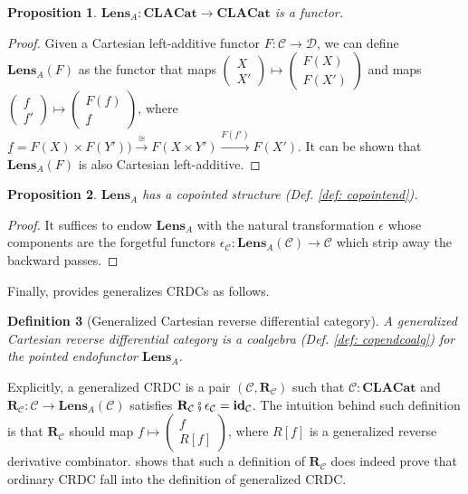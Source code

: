 \documentclass[12pt,a4paper,openright,twoside]{report}
\theoremstyle{plain}
\newtheorem{proposition}{Proposition}
\newtheorem{definition}[proposition]{Definition}
\theoremstyle{definition}
\begin{document}
\begin{proposition}
  $\mathbf{Lens}_A: \mathbf{CLACat} \to \mathbf{CLACat}$ is a functor.
\end{proposition}
\begin{proof}
  Given a Cartesian left-additive functor $F: \mathcal{C} \to \mathcal{D}$, we can define $\mathbf{Lens}_A(F)$ as the functor that maps $\left(\begin{smallmatrix}X  \\ X' \end{smallmatrix}\right) \mapsto \left(\begin{smallmatrix} F(X) \\ F(X') \end{smallmatrix}\right)$ and maps $\left(\begin{smallmatrix}f  \\ f' \end{smallmatrix}\right) \mapsto \left(\begin{smallmatrix} F(f) \\ \underline{f} \end{smallmatrix}\right)$, where $\underline{f} = F(X) \times F(Y')) \stackrel{\cong}{\longrightarrow} F(X \times Y') \stackrel{F(f')}{\longrightarrow}F(X')$. It can be shown that $\mathbf{Lens}_A(F)$ is also Cartesian left-additive.
\end{proof}

\begin{proposition}
  $\mathbf{Lens}_A$ has a copointed structure (\textit{Def. \ref{def: copointend}}).
\end{proposition}
\begin{proof}
  It suffices to endow $\mathbf{Lens}_A$ with the natural transformation $\epsilon$ whose components are the forgetful functors $\epsilon_{\mathcal{C}}: \mathbf{Lens}_A(\mathcal{C}) \to \mathcal{C}$ which strip away the backward passes.
\end{proof}

Finally, \cite{gavranovic2024fundamental} provides generalizes CRDCs as follows.

\begin{definition}[Generalized Cartesian reverse differential category]
  A generalized Cartesian reverse differential category is a coalgebra (\textit{Def. \ref{def: copendcoalg}}) for the pointed endofunctor $\mathbf{Lens}_A$. 
\end{definition}

Explicitly, a generalized CRDC is a pair $(\mathcal{C}, \mathbf{R}_{\mathcal{C}})$ such that $\mathcal{C}: \mathbf{CLACat}$ and $\mathbf{R}_{\mathcal{C}}: \mathcal{C} \to \mathbf{Lens}_A(\mathcal{C})$ satisfies $\mathbf{R}_{\mathcal{C}} \fatsemi \epsilon_{\mathcal{C}} = \mathbf{id}_{\mathcal{C}}$. The intuition behind such definition is that $\mathbf{R}_{\mathcal{C}}$ should map $f \mapsto \left(\begin{smallmatrix} f \\ R[f] \end{smallmatrix}\right)$, where $R[f]$ is a generalized reverse derivative combinator. \cite{gavranovic2024fundamental} shows that such a definition of $\mathbf{R}_{\mathcal{C}}$ does indeed prove that ordinary CRDC fall into the definition of generalized CRDC. 
\end{document}
